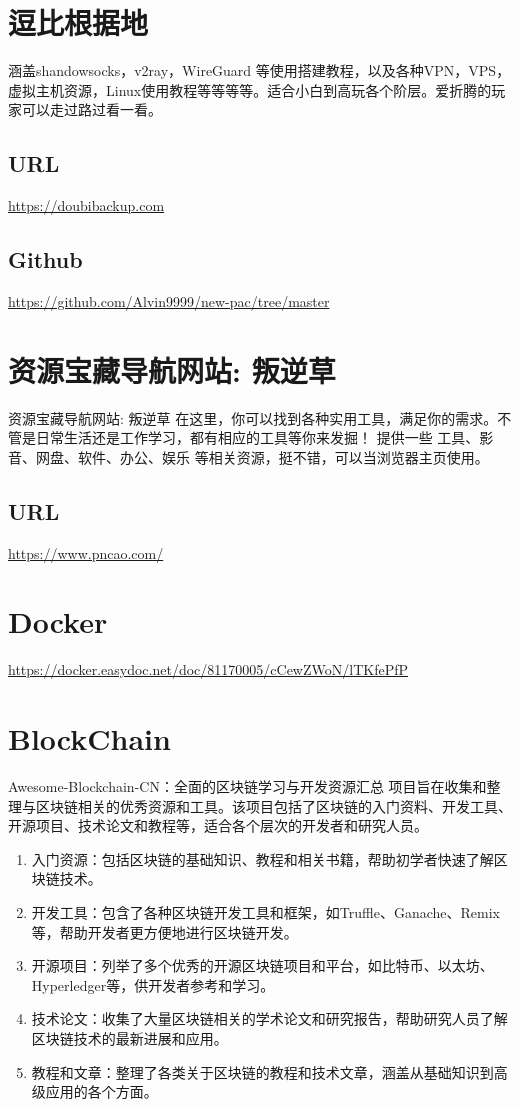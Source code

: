 \documentclass[11pt]{article}
\begin{document}
\section{逗比根据地}
\label{sec:org4c17e6b}
涵盖shandowsocks，v2ray，WireGuard 等使用搭建教程，以及各种VPN，VPS，虚拟主机资源，Linux使用教程等等等等。适合小白到高玩各个阶层。爱折腾的玩家可以走过路过看一看。
\subsection{URL}
\label{sec:orgf903950}
\url{https://doubibackup.com}
\subsection{Github}
\label{sec:org86e1614}
\url{https://github.com/Alvin9999/new-pac/tree/master}

\section{资源宝藏导航网站: 叛逆草}
\label{sec:org86c6828}
资源宝藏导航网站: 叛逆草
在这里，你可以找到各种实用工具，满足你的需求。不管是日常生活还是工作学习，都有相应的工具等你来发掘！
提供一些 工具、影音、网盘、软件、办公、娱乐 等相关资源，挺不错，可以当浏览器主页使用。
\subsection{URL}
\label{sec:org8944dc7}
\url{https://www.pncao.com/}

\section{Docker}
\label{sec:orgda21947}
\url{https://docker.easydoc.net/doc/81170005/cCewZWoN/lTKfePfP}


\section{BlockChain}
\label{sec:org7a2955b}
Awesome-Blockchain-CN：全面的区块链学习与开发资源汇总
项目旨在收集和整理与区块链相关的优秀资源和工具。该项目包括了区块链的入门资料、开发工具、开源项目、技术论文和教程等，适合各个层次的开发者和研究人员。
\begin{enumerate}
\item 入门资源：包括区块链的基础知识、教程和相关书籍，帮助初学者快速了解区块链技术。
\item 开发工具：包含了各种区块链开发工具和框架，如Truffle、Ganache、Remix等，帮助开发者更方便地进行区块链开发。
\item 开源项目：列举了多个优秀的开源区块链项目和平台，如比特币、以太坊、Hyperledger等，供开发者参考和学习。
\item 技术论文：收集了大量区块链相关的学术论文和研究报告，帮助研究人员了解区块链技术的最新进展和应用。
\item 教程和文章：整理了各类关于区块链的教程和技术文章，涵盖从基础知识到高级应用的各个方面。
\end{enumerate}
\end{document}
